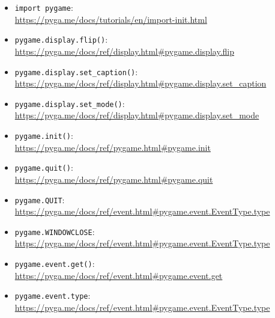 \begin{pygbox}
\begin{itemize}
	\item \texttt{import pygame}:\\ \url{https://pyga.me/docs/tutorials/en/import-init.html}
	
	\item \texttt{pygame.display.flip()}:
	\\
	\url{https://pyga.me/docs/ref/display.html#pygame.display.flip}
	
	\item \texttt{pygame.display.set\_caption()}:
	\\
	\url{https://pyga.me/docs/ref/display.html#pygame.display.set_caption}

	\item \texttt{pygame.display.set\_mode()}:
	\\
	\url{https://pyga.me/docs/ref/display.html#pygame.display.set_mode}

	\item \texttt{pygame.init()}:
	\\
	\url{https://pyga.me/docs/ref/pygame.html#pygame.init}

	\item \texttt{pygame.quit()}:
	\\
	\url{https://pyga.me/docs/ref/pygame.html#pygame.quit}

	\item \texttt{pygame.QUIT}:
	\\
    \url{https://pyga.me/docs/ref/event.html#pygame.event.EventType.type}
    
	\item \texttt{pygame.WINDOWCLOSE}:
	\\
	\url{https://pyga.me/docs/ref/event.html#pygame.event.EventType.type}

	\item \texttt{pygame.event.get()}:
	\\
	\url{https://pyga.me/docs/ref/event.html#pygame.event.get}
	
	\item \texttt{pygame.event.type}:
	\\
	\url{https://pyga.me/docs/ref/event.html#pygame.event.EventType.type}


\end{itemize}
\end{pygbox}
